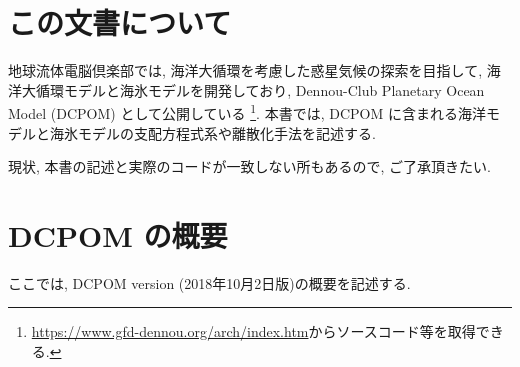 \section{この文書について}
地球流体電脳倶楽部では, 海洋大循環を考慮した惑星気候の探索を目指して, 
海洋大循環モデルと海氷モデルを開発しており, 
Dennou-Club Planetary Ocean Model (DCPOM) として公開している%
\footnote{
\url{https://www.gfd-dennou.org/arch/index.htm}からソースコード等を取得できる. 
}. 
本書では, DCPOM に含まれる海洋モデルと海氷モデルの支配方程式系や離散化手法を記述する. 

現状, 本書の記述と実際のコードが一致しない所もあるので, ご了承頂きたい. 

\section{DCPOM の概要}
ここでは, DCPOM version \version \; (2018年10月2日版)の概要を記述する. 


